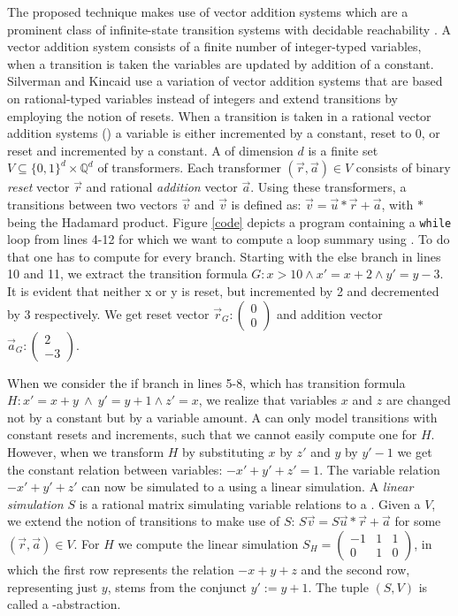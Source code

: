 The proposed technique makes use of vector addition systems which are a prominent class of infinite-state transition systems with decidable reachability \cite{DBLP:conf/rp/HaaseH14}. A vector addition system consists of a finite number of integer-typed variables, when a transition is taken the variables are updated by addition of a constant. Silverman and Kincaid use a variation of vector addition systems that are based on rational-typed variables instead of integers and extend transitions by employing the notion of resets. When a transition is taken in a rational vector addition systems (\qvasr) a variable is either incremented by a constant, reset to 0, or reset and incremented by a constant.
A \qvasr of dimension $d$ is a finite set $V \subseteq \{0, 1\}^d \times \mathbb{Q}^d$ of transformers. Each transformer $(\vec{r}, \vec{a}) \in V$ consists of binary \textsl{reset} vector $\vec{r}$ and rational \textsl{addition} vector $\vec{a}$. Using these transformers, a transitions between two vectors $\vec{v}$ and $\vec{v}$ is defined as: $\vec{v} = \vec{u} * \vec{r} + \vec{a}$, with $*$ being the Hadamard product. Figure \ref{code} depicts a program containing a \texttt{while} loop from lines 4-12 for which we want to compute a loop summary using \qvasr. To do that one has to compute \qvasr for every branch. Starting with the else branch in lines 10 and 11, we extract the transition formula $G: x > 10 \land x' = x + 2 \land y' = y - 3$. It is evident that neither x or y is reset, but incremented by 2 and decremented by 3 respectively. We get reset vector $\vec{r}_G: \begin{pmatrix} 0 \\ 0\end{pmatrix}$ and addition vector $\vec{a}_G: \begin{pmatrix} 2 \\ -3\end{pmatrix}$.  \par
When we consider the if branch in lines 5-8, which has transition formula $H: x' = x + y\ \land\ y' = y + 1 \land z' = x$, we realize that variables $x$ and $z$ are changed not by a constant but by a variable amount. A \qvasr can only model transitions with constant resets and increments, such that we cannot easily compute one for $H$. However, when we transform $H$ by substituting $x$ by $z'$ and $y$ by $y'-1$ we get the constant relation between variables: $-x' + y' + z' = 1$. The variable relation $-x' + y' + z'$ can now be simulated to a \qvasr using a linear simulation. A \textsl{linear simulation} $S$ is a rational matrix simulating variable relations to a \qvasr. Given a \qvasr $V$, we extend the notion of \qvasr transitions to make use of $S$: $S\vec{v} = S\vec{u} * \vec{r} + \vec{a}$ for some $(\vec{r}, \vec{a}) \in V$. For $H$ we compute the linear simulation $S_H = \begin{pmatrix}
	-1 & 1 & 1 \\
	0 & 1 & 0
\end{pmatrix}$, in which the first row represents the relation $-x + y + z$ and the second row, representing just $y$, stems from the conjunct $y' := y + 1$. The tuple $(S, V)$ is called a \qvasr-abstraction. \par
